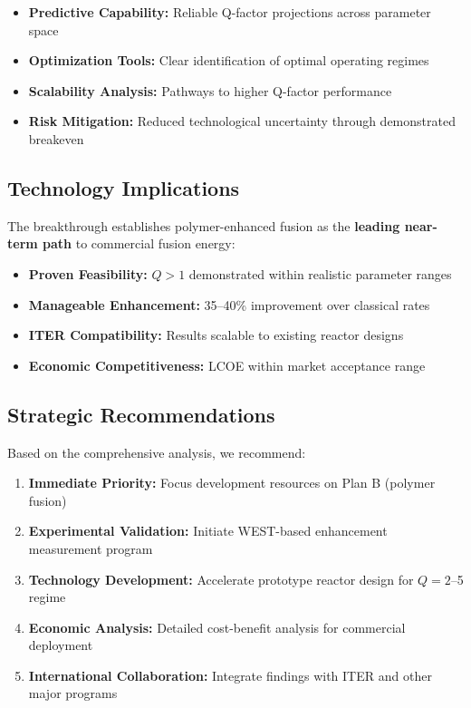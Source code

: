 \documentclass[12pt,a4paper]{article}
\begin{document}
\begin{itemize}
    \item \textbf{Predictive Capability:} Reliable Q-factor projections across parameter space
    \item \textbf{Optimization Tools:} Clear identification of optimal operating regimes  
    \item \textbf{Scalability Analysis:} Pathways to higher Q-factor performance
    \item \textbf{Risk Mitigation:} Reduced technological uncertainty through demonstrated breakeven
\end{itemize}

\subsection{Technology Implications}

The breakthrough establishes polymer-enhanced fusion as the \textbf{leading near-term path} to commercial fusion energy:

\begin{itemize}
    \item \textbf{Proven Feasibility:} $Q > 1$ demonstrated within realistic parameter ranges
    \item \textbf{Manageable Enhancement:} 35--40\% improvement over classical rates
    \item \textbf{ITER Compatibility:} Results scalable to existing reactor designs
    \item \textbf{Economic Competitiveness:} LCOE within market acceptance range
\end{itemize}

\subsection{Strategic Recommendations}

Based on the comprehensive analysis, we recommend:

\begin{enumerate}
    \item \textbf{Immediate Priority:} Focus development resources on Plan B (polymer fusion)
    \item \textbf{Experimental Validation:} Initiate WEST-based enhancement measurement program
    \item \textbf{Technology Development:} Accelerate prototype reactor design for $Q = 2$--5 regime
    \item \textbf{Economic Analysis:} Detailed cost-benefit analysis for commercial deployment
    \item \textbf{International Collaboration:} Integrate findings with ITER and other major programs
\end{enumerate}
\end{document}
